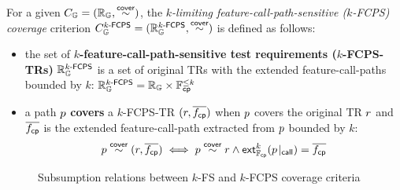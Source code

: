 
\begin{definition}\label{def:k-fcps-cov}
  For a given $C_{\mathbb{G}} = (\mathbb{R}_{\mathbb{G}}, \overset{\textsf{cover}}{\sim})$, the
  \textit{$k$-limiting feature-call-path-sensitive ($k$-FCPS) coverage}
  criterion $C_{\mathbb{G}}^{{k}\textsf{-FCPS}} = (\mathbb{R}_{\mathbb{G}}^{{k}\textsf{-FCPS}}, \overset{\textsf{cover}}{\sim})$ is defined
  as follows:
  \begin{itemize}
    \item the set of \textbf{$k$-feature-call-path-sensitive test requirements
      ($k$-FCPS-TRs)} $\mathbb{R}_{\mathbb{G}}^{{k}\textsf{-FCPS}}$ is a set of original TRs with the
      extended feature-call-paths bounded by $k$:
$
        \mathbb{R}_{\mathbb{G}}^{{k}\textsf{-FCPS}} = \mathbb{R}_{\mathbb{G}} \times \mathbb{F}_{\textsf{cp}}^{\leq k}
$
    \item a path $p$ \textbf{covers} a $k$-FCPS-TR $(r, \overline{f_{\textsf{cp}}})$ when $p$
      covers the original TR $r$ and $\overline{f_{\textsf{cp}}}$ is the extended feature-call-path
extracted from $p$ bounded by $k$:
\[
        p \overset{\textsf{cover}}{\sim} (r, \overline{f_{\textsf{cp}}}) \iff p \overset{\textsf{cover}}{\sim} r \wedge
        \textsf{ext}_{\mathbb{F}_{\textsf{cp}}}^{k}({p}\!\mid_{\textsf{call}}) = \overline{f_{\textsf{cp}}}
\]
  \end{itemize}
\end{definition}


\begin{figure}
  \centering
\scriptsize
\vspace*{-1em}
  \caption{
    Subsumption relations between $k$-FS and $k$-FCPS coverage criteria
  }
\vspace*{-1em}
  \label{fig:subs}
\end{figure}

